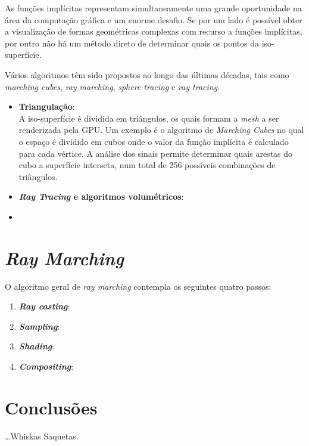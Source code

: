 As funções implícitas representam simultaneamente uma grande oportunidade na área da computação gráfica e um enorme desafio. Se por um lado é possível obter a visualização de formas geométricas complexas com recurso a funções implícitas, por outro não há um método direto de determinar quais os pontos da iso-superfície.

Vários algoritmos têm sido propostos ao longo das últimas décadas, tais como \textit{marching cubes}\cite{Lorensen1987}, \textit{ray marching}, \textit{sphere tracing}\cite{Hart1996} e \textit{ray tracing}.

\begin{itemize}
	
	\item \textbf{Triangulação}:\\
	A iso-superfície é dividida em triângulos, os quais formam a \textit{mesh} a ser renderizada pela \ac{GPU}. Um exemplo é o algoritmo de \textit{Marching Cubes}\cite{Lorensen1987} no qual o espaço é dividido em cubos onde o valor da função implícita é calculado para cada vértice. A análise dos sinais permite determinar quais arestas do cubo a superfície interseta, num total de 256 possíveis combinações de triângulos.
	
	\item \textbf{\textit{Ray Tracing} e algoritmos volumétricos}:\\
	
	\item {}
\end{itemize}


\section{\emph{Ray Marching}}
\label{sec::arte:raymarch}


O algoritmo geral de \textit{ray marching} contempla os seguintes quatro passos:

\begin{enumerate}
	\item \textbf{\textit{Ray casting}}:
	
	\item \textbf{\textit{Sampling}}:
	
	\item \textbf{\textit{Shading}}:
	
	\item \textbf{\textit{Compositing}}:
\end{enumerate}


\section{\opengl}
\label{sec::arte:opengl}



\section{Conclusões}
\label{sec::arte:conc}

\ldots Whiskas Saquetas.
